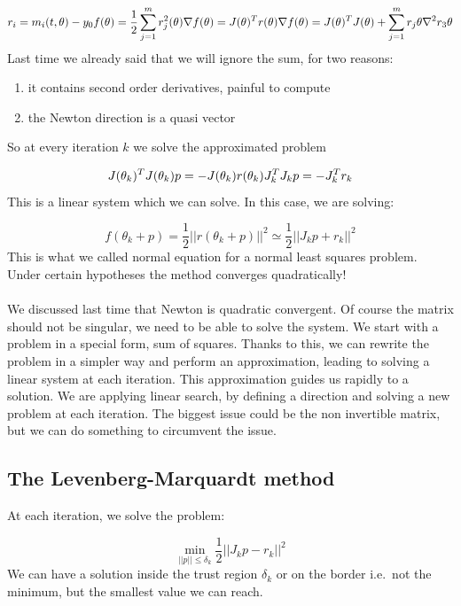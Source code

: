 $$
r_i = m_i(t,\theta) - y_0 \\ f(\theta)= \frac{1}{2} \sum^m_{j=1} r_j^2 (\theta) \\ \nabla f(\theta) = J(\theta)^{T} r (\theta) \\ \nabla f(\theta) = J(\theta)^{T} J (\theta) + \sum^m_{j=1} r_j \theta \nabla^2 r_3 \theta\\
$$
\noindent
Last time we already said that we will ignore the sum, for two reasons:

\begin{enumerate}
\def\labelenumi{\arabic{enumi}.}
\tightlist
\item
  it contains second order derivatives, painful to compute
\item
  the Newton direction is a quasi vector
\end{enumerate}

So at every iteration $k$ we solve the approximated problem

$$
J(\theta_k)^TJ(\theta_k)p=-J(\theta_k)r(\theta_k) \\ J_k^TJ_kp=-J_k^T r_k
$$
\noindent
This is a linear system which we can solve. In this case, we are
solving:

$$
f(\theta_k+p)= \frac{1}{2} ||r(\theta_k+p)||^2 \simeq \frac{1}{2} ||J_kp+r_k||^2
$$
\noindent
This is what we called normal equation for a normal least squares
problem. Under certain hypotheses the method converges quadratically!
\\
\\
\noindent
We discussed last time that Newton is quadratic convergent. Of course
the matrix should not be singular, we need to be able to solve the
system. We start with a problem in a special form, sum of squares.
Thanks to this, we can rewrite the problem in a simpler way and perform
an approximation, leading to solving a linear system at each iteration.
This approximation guides us rapidly to a solution. We are applying
linear search, by defining a direction and solving a new problem at each
iteration. The biggest issue could be the non invertible matrix, but we
can do something to circumvent the issue.


\subsection{The Levenberg-Marquardt method}

At each iteration, we solve the problem:

$$
\min_{||p||\leq\delta_k} \frac{1}{2} ||J_kp-r_k||^2
$$
\noindent
We can have a solution inside the trust region $\delta_k$ or on the
border i.e.~not the minimum, but the smallest value we can reach.

